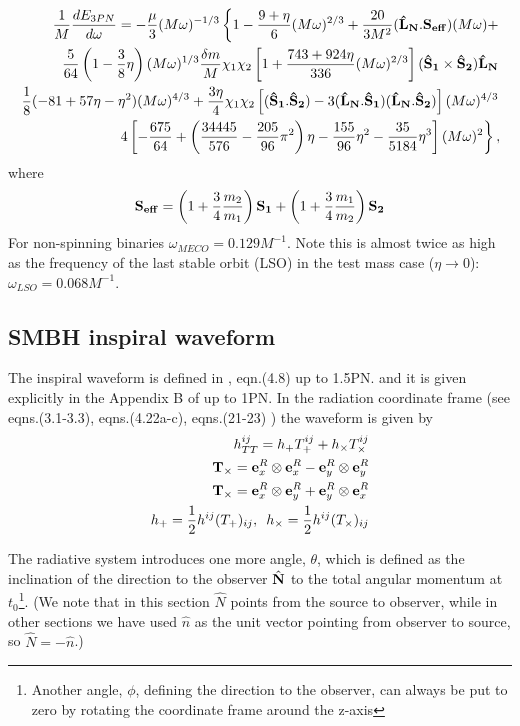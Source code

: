 \documentclass[11pt]{report}
\def\be{\begin{equation}}
\def\ee{\end{equation}}
\def\bea{\begin{eqnarray}}
\def\ena{\end{eqnarray}}
\def\bSo{{\bf \hat{S}_1}}
\def\bSt{{\bf \hat{S}_2}}
\def\bL{{\bf \hat{L}_{N}}}
\begin{document}
\bea
\frac1{M} \frac{dE_{3PN}}{d\omega} = -\frac{\mu}{3}(M\omega)^{-1/3}\left\{
1 - \frac{9+\eta}{6}(M\omega)^{2/3} + \frac{20}{3M^2}(\bL.{\bf S_{eff}})(M\omega)+
\right. \nonumber\\
\left. \frac5{64}\left( 1 - \frac3{8}\eta\right) (M\omega)^{1/3} \frac{\delta m}{M}
\chi_1\chi_2\left[ 1 + \frac{743 + 924\eta}{336}(M\omega)^{2/3}\right]
(\bSo\times\bSt)\bL \right. \nonumber \\
\left. \frac{1}{8}(-81 + 57\eta -\eta^2)(M\omega)^{4/3} + \frac{3\eta}{4}
\chi_1\chi_2 \left[ (\bSo.\bSt) - 3(\bL.\bSo)(\bL.\bSt) \right](M\omega)^{4/3}
\right. \nonumber \\
\left. 4\left[ -\frac{675}{64} + \left( \frac{34445}{576} - \frac{205}{96}\pi^2
\right)\eta -\frac{155}{96}\eta^2 - \frac{35}{5184}\eta^3 \right](M\omega)^{2}
\right\},
\ena 
where 
\be
{\bf S_{eff}} = \left( 1 + \frac3{4}\frac{m_2}{m_1} \right) {\bf S_1}+ 
\left( 1 + \frac3{4}\frac{m_1}{m_2} \right) {\bf S_2}
\ee
For non-spinning binaries $\omega_{MECO} = 0.129M^{-1}$.  Note this is almost twice as high
as the frequency of the last stable orbit (LSO)  
in the test mass case ($\eta \to 0$): $\omega_{LSO} = 0.068M^{-1}$.

\subsection{SMBH inspiral waveform}\label{smbh-wave}

The inspiral waveform is defined in \cite{Kidder}, eqn.(4.8) up to 
1.5PN. and it is given explicitly in the Appendix B of \cite{Kidder} 
up to 1PN. In the radiation coordinate frame (see \cite{FC} eqns.(3.1-3.3),
\cite{Kidder} eqns.(4.22a-c), \cite{BCV2} eqns.(21-23) )
the waveform is given by
\begin{eqnarray}
h_{TT}^{ij} = h_+T^{ij}_+ + h_{\times}T^{ij}_{\times}\\
{\bf T}_{\times} = {\bf e}_x^R\otimes{\bf e}_x^R - {\bf e}_y^R\otimes{\bf e}_y^R\\
{\bf T}_{\times} = {\bf e}_x^R\otimes{\bf e}_y^R + {\bf e}_y^R\otimes{\bf e}_x^R\\
h_+ = \frac1{2}h^{ij}(T_+)_{ij}, \,\,\, 
h_{\times} = \frac1{2}h^{ij}(T_{\times})_{ij}
\end{eqnarray}

The radiative system introduces one more angle, $\theta$, which
is defined as the inclination of the direction to the observer $\hat{\bf N}$
to the total angular momentum at $t_0$\footnote{Another angle, $\phi$, defining 
the direction to the observer, can always
be put to zero by rotating the  coordinate frame around the z-axis}.
(We note that in this section $\hat N$ points from the source to observer, while in
other sections we have used $\hat n$ as the unit vector pointing from observer to source, so
$\hat N = - \hat n$.) 
\end{document}
